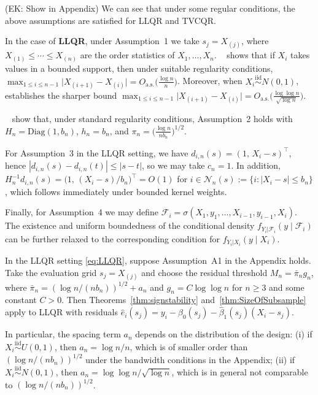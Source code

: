 \documentclass[lineno]{biometrika}
\newcommand{\ek}[1]{\textcolor{ultramarine}{(EK: #1)}}
\begin{document}
\ek{Show in Appendix} We can see that under some regular conditions, the above assumptions are satisfied for LLQR and TVCQR.

In the case of \textbf{LLQR}, under Assumption~1 we take $s_j=X_{(j)}$, where
$X_{(1)}\le \cdots \le X_{(n)}$ are the order statistics of $X_1,\ldots,X_n$.
~\cite{deheuvels1984strong} shows that if $X_i$ takes values in a bounded support, then under suitable regularity conditions,
$\max_{1\le i\le n-1}\big|X_{(i+1)}-X_{(i)}\big|
=O_{\mathrm{a.s.}}\!\big(\frac{\log n}{n}\big)$.
Moreover, when $X_i\stackrel{\mathrm{iid}}{\sim}N(0,1)$, ~\cite{deheuvels1985limiting} establishes the sharper bound
$\max_{1\le i\le n-1}\big|X_{(i+1)}-X_{(i)}\big|
=O_{\mathrm{a.s.}}\!\big(\frac{\log\log n}{\sqrt{\log n}}\big)$.

~\cite{kong2010uniform} show that, under standard regularity conditions, Assumption~2 holds with
$H_n=\mathrm{Diag}(1,b_n)$, $h_n=b_n$, and
$\pi_n=\big(\frac{\log n}{n b_n}\big)^{1/2}$.

For Assumption~3 in the LLQR setting, we have $d_{i,n}(s)=(1,\,X_i-s)^\top$, hence
$|d_{i,n}(s)-d_{i,n}(t)|\le |s-t|$, so we may take $c_n=1$. In addition,
$H_n^{-1}d_{i,n}(s)=\big(1,\,(X_i-s)/b_n\big)^\top=O(1)$ for
$i\in \mathcal N_n(s):=\{i:|X_i-s|\le b_n\}$, which follows immediately under bounded kernel weights.

Finally, for Assumption~4 we may define
$\mathcal F_i=\sigma(X_1,y_1,\ldots,X_{i-1},y_{i-1},X_i)$.
The existence and uniform boundedness of the conditional density $f_{Y_i|\mathcal F_i}(y\mid \mathcal F_i)$ can be further relaxed
to the corresponding condition for $f_{Y_i|X_i}(y\mid X_i)$.


\begin{corollary}
\label{cor:llqr}
In the LLQR setting \eqref{eq:LLQR}, suppose Assumption~A1 in the Appendix holds.
Take the evaluation grid $s_j=X_{(j)}$ and choose the residual threshold
$M_n=\bar\pi_n g_n$, where
$\bar\pi_n=(\log n/(n b_n))^{1/2}+a_n$ and $g_n=C\log\log n$ for $n\ge3$ and some constant $C>0$.
Then Theorems~\ref{thm:signstability} and~\ref{thm:SizeOfSubsample} apply to LLQR with residuals
$\hat e_i(s_j)=y_i-\hat\beta_0(s_j)-\hat\beta_1(s_j)(X_i-s_j)$.

In particular, the spacing term $a_n$ depends on the distribution of the design:
(i) if $X_i\stackrel{\mathrm{iid}}{\sim}U(0,1)$, then $a_n=\log n/n$, which is of smaller order than
$(\log n/(n b_n))^{1/2}$ under the bandwidth conditions in the Appendix;
(ii) if $X_i\stackrel{\mathrm{iid}}{\sim}N(0,1)$, then $a_n=\log\log n/\sqrt{\log n}$, which is in general not comparable
to $(\log n/(n b_n))^{1/2}$.
\end{corollary}
\end{document}
